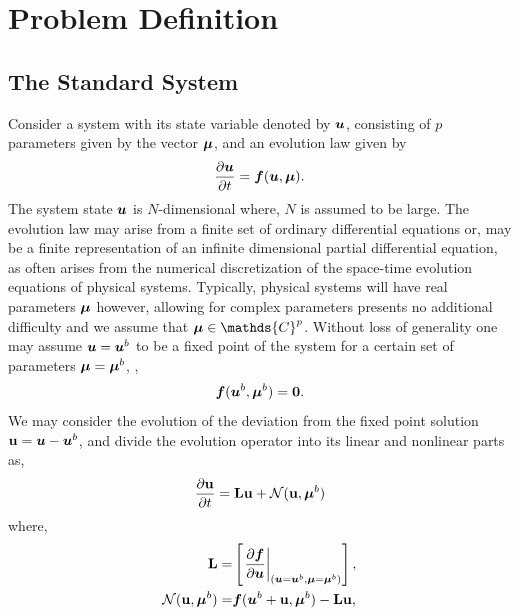 \section{Problem Definition}
\label{sec:problem_setup}

\subsection{The Standard System}
\label{sec:standard_system}

Consider a system with its state variable denoted by $\boldsymbol{u}$, consisting of $p$ parameters given by the vector $\boldsymbol{\mu}$, and an evolution law given by
\begin{equation}
	\frac{\partial \boldsymbol{u}}{\partial t} = \boldsymbol{f}(\boldsymbol{u},\boldsymbol{\mu}).
	\label{eqn:evolution0}
\end{equation}
The system state $\boldsymbol{u}$ is $N$-dimensional where, $N$ is assumed to be large. 
The evolution law may arise from a finite set of ordinary differential equations or, may be a finite representation of an infinite dimensional partial differential equation, as often arises from the numerical discretization of the space-time evolution equations of physical systems. Typically, physical systems will have real parameters $\boldsymbol{\mu}$ however, allowing for complex parameters presents no additional difficulty and we assume that $\vecmu \in \mathds{C}^{p}$. Without loss of generality one may assume $\boldsymbol{u} = \boldsymbol{u}^{b}$ to be a fixed point of the system for a certain set of parameters $\boldsymbol{\mu} = \boldsymbol{\mu}^{b}$, \ie,
\begin{align}
	\label{eqn:fixed_point}
	\boldsymbol{f}(\boldsymbol{u}^{b},\boldsymbol{\mu}^{b}) = \mathbf{0}.
\end{align}
We may consider the evolution of the deviation from the fixed point solution $\mathbf{u} = \boldsymbol{u} - \boldsymbol{u}^{b}$, and divide the evolution operator into its linear and nonlinear parts as,
\begin{align}
	\frac{\partial \mathbf{u}}{\partial t} = \mathbf{L} \mathbf{u} + \mathcal{N}(\mathbf{u},\boldsymbol{\mu}^{b})
\end{align}
where,
\begin{align}
	\mathbf{L} =& \left[\left.\dfrac{\partial \boldsymbol{f}}{\partial \boldsymbol{u}}\right|_{(\boldsymbol{u}=\boldsymbol{u}^{b},\boldsymbol{\mu}=\boldsymbol{\mu}^{b})}\right], \nonumber \\
	\mathcal{N}(\mathbf{u},\boldsymbol{\mu}^{b}) =& \boldsymbol{f}(\boldsymbol{u}^{b} + \mathbf{u},\boldsymbol{\mu}^{b}) - \mathbf{L}\mathbf{u}, \nonumber
\end{align}
